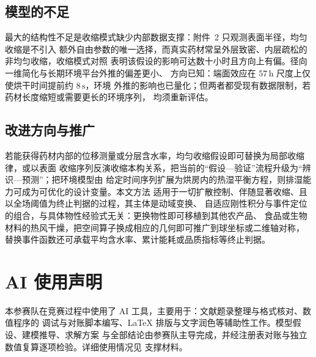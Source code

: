 \documentclass[withoutpreface,bwprint]{cumcmthesis} %
\begin{document}
\subsection{模型的不足}

最大的结构性不足是收缩模式缺少内部数据支撑：附件~2 只观测表面半径，均匀收缩是不引入
额外自由参数的唯一选择，而真实药材常呈外层致密、内层疏松的非均匀收缩，收缩模式对照
表明该假设的影响可达数十小时且方向上有偏。径向一维简化与长期环境平台外推的偏差更小、
方向已知：端面效应在 $57\,\mathrm{h}$ 尺度上仅使烘干时间提前约 $8\,\mathrm{s}$，环境
外推的影响也已量化；但两者都受现有数据限制，若药材长度缩短或需要更长的环境序列，
均须重新评估。

\subsection{改进方向与推广}

若能获得药材内部的位移测量或分层含水率，均匀收缩假设即可替换为局部收缩律，或以表面
收缩序列反演收缩本构关系，把当前的“假设—验证”流程升级为“辨识—预测”；把环境模型由
给定时间序列扩展为烘房内的热湿平衡方程，则排湿能力可成为可优化的设计变量。本文方法
适用于一切扩散控制、伴随显著收缩、且以全场阈值为终止判据的过程，其主体是动域变换、
自适应刚性积分与事件定位的组合，与具体物性经验式无关：更换物性即可移植到其他农产品、
食品或生物材料的热风干燥，把空间算子换成相应的几何即可推广到球坐标或二维轴对称，
替换事件函数还可承载平均含水率、累计能耗或品质指标等终止判据。

\section*{AI 使用声明}
本参赛队在竞赛过程中使用了 AI 工具，主要用于：文献题录整理与格式核对、数值程序的
调试与对账脚本编写、LaTeX 排版与文字润色等辅助性工作。模型假设、建模推导、求解方案
与全部结论由参赛队主导完成，并经注册表对账与独立数值复算逐项检验。详细使用情况见
支撑材料。
\end{document}

